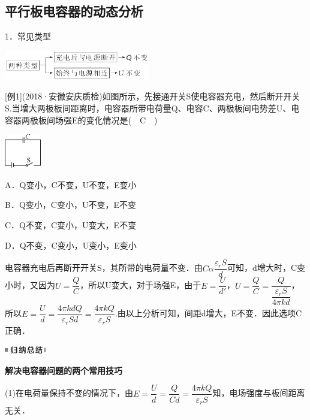 \documentclass[cn,10.5pt,chinese,mac,chinesefont=founder]{elegantbook}
\begin{document}
\newpage
\subsection{平行板电容器的动态分析}

1．常见类型

\begin{center}\includegraphics[width=2.51042in,height=0.5in]{media/image295.png}\end{center}

{[}例1{]}(2018·安徽安庆质检)如图所示，先接通开关S使电容器充电，然后断开开关S.当增大两极板间距离时，电容器所带电荷量Q、电容C、两极板间电势差U、电容器两极板间场强E的变化情况是(　C　)

\begin{center}\includegraphics[width=0.625in,height=0.58333in]{media/image296.png}\end{center}

A．Q变小，C不变，U不变，E变小

B．Q变小，C变小，U不变，E不变

C．Q不变，C变小，U变大，E不变

D．Q不变，C变小，U变小，E变小

\begin{solution}
	电容器充电后再断开开关S，其所带的电荷量不变．由$C \alpha \dfrac{\varepsilon_{r} S}{d}$可知，d增大时，C变小时，又因为$U=\dfrac{Q}{C}$，所以U变大，对于场强E，由于$E=\dfrac{U}{d'}$，$U=\dfrac{Q}{C}=\dfrac{Q}{\dfrac{\varepsilon_{r} S}{4 \pi k d}}$，所以$E=\dfrac{U}{d}=\dfrac{4 \pi k d Q}{\varepsilon_{r} S d}=\dfrac{4 \pi k Q}{\varepsilon_{r} S}$.由以上分析可知，间距d增大，E不变．因此选项C正确．
\end{solution}
\begin{center}\includegraphics[width=0.70833in,height=0.125in]{media/image13.png}

\textbf{解决电容器问题的两个常用技巧}
\end{center}


(1)在电荷量保持不变的情况下，由$E=\dfrac{U}{d}=\dfrac{Q}{Cd} =\dfrac{4 \pi k Q}{\varepsilon_{r} S}$知，电场强度与板间距离无关．
\end{document}

